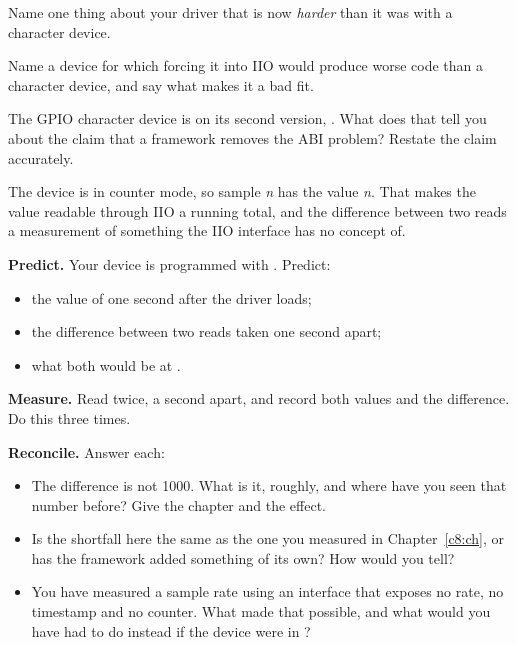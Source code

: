  Name one thing about your driver that is now \emph{harder} than it was with a character
device.

 Name a device for which forcing it into IIO would produce worse code than a character
device, and say what makes it a bad fit.

 The GPIO character device is on its second version, . What does that tell
you about the claim that a framework removes the ABI problem? Restate the claim accurately.

\label{c11:ex:9}

The device is in counter mode, so sample \emph{n} has the value \emph{n}. That makes the value
readable through IIO a running total, and the difference between two reads a measurement of
something the IIO interface has no concept of.

 \textbf{Predict.} Your device is programmed with . Predict:
\begin{itemize}
  \item the value of  one second after the driver loads;
  \item the difference between two reads taken one second apart;
  \item what both would be at .
\end{itemize}

 \textbf{Measure.} Read  twice, a second apart, and record both
values and the difference. Do this three times.

 \textbf{Reconcile.} Answer each:
\begin{itemize}
  \item The difference is not 1000. What is it, roughly, and where have you seen that number before?
    Give the chapter and the effect.
  \item Is the shortfall here the same as the one you measured in Chapter~\ref{c8:ch}, or has the
    framework added something of its own? How would you tell?
  \item You have measured a sample rate using an interface that exposes no rate, no timestamp and no
    counter. What made that possible, and what would you have had to do instead if the device were
    in ?
\end{itemize}

